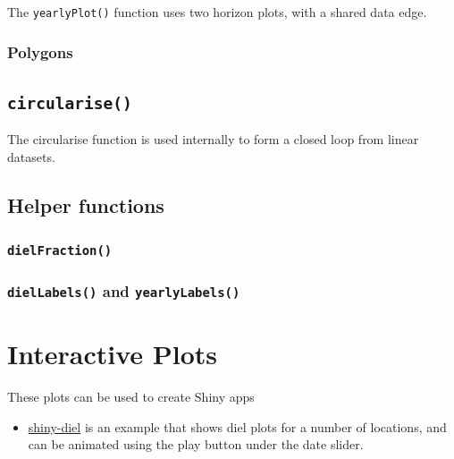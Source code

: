 \documentclass[
]{book}
\providecommand{\tightlist}{%
  \setlength{\itemsep}{0pt}\setlength{\parskip}{0pt}}
\begin{document}
The \texttt{yearlyPlot()} function uses two horizon plots, with a shared data edge.

\hypertarget{polygons}{%
\subsubsection{Polygons}\label{polygons}}

\hypertarget{circularise-1}{%
\subsection{\texorpdfstring{\texttt{circularise()}}{circularise()}}\label{circularise-1}}

The circularise function is used internally to form a closed loop from linear datasets.

\hypertarget{helper-functions}{%
\subsection{Helper functions}\label{helper-functions}}

\hypertarget{dielfraction}{%
\subsubsection{\texorpdfstring{\texttt{dielFraction()}}{dielFraction()}}\label{dielfraction}}

\hypertarget{diellabels-and-yearlylabels}{%
\subsubsection{\texorpdfstring{\texttt{dielLabels()} and \texttt{yearlyLabels()}}{dielLabels() and yearlyLabels()}}\label{diellabels-and-yearlylabels}}

\hypertarget{interactive-plots}{%
\section{Interactive Plots}\label{interactive-plots}}

These plots can be used to create Shiny apps

\begin{itemize}
\tightlist
\item
  \href{https://shiny.ebaker.me.uk/shiny-diel/}{shiny-diel} is an example that shows diel plots for a number of locations, and can be animated using the play button under the date slider.
\end{itemize}
\end{document}
